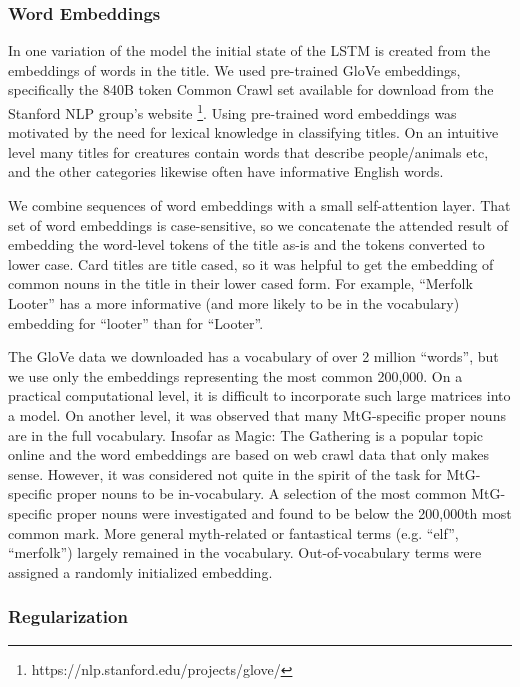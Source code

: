 \documentclass[letterpaper]{article} %
\begin{document}
\subsubsection{Word Embeddings}

In one variation of the model
the initial state of the LSTM
is created from the embeddings of words in the title.
We used pre-trained GloVe \cite{Pennington2014GloveGV} embeddings,
specifically the 840B token Common Crawl set
available for download from the Stanford NLP group's website
\footnote{https://nlp.stanford.edu/projects/glove/}.
Using pre-trained word embeddings
was motivated by the need for lexical knowledge in classifying titles.
On an intuitive level many titles for creatures
contain words that describe people/animals etc,
and the other categories likewise often have informative English words.

We combine sequences of word embeddings with a small self-attention layer.
That set of word embeddings is case-sensitive,
so we concatenate the attended result of embedding
the word-level tokens of the title as-is
and the tokens converted to lower case.
Card titles are title cased,
so it was helpful to get the embedding of common nouns in the title
in their lower cased form.
For example,
``Merfolk Looter''
has a more informative (and more likely to be in the vocabulary)
embedding for ``looter'' than for ``Looter''.

The GloVe data we downloaded has a vocabulary of over 2 million ``words'',
but we use only the embeddings representing the most common 200,000.
On a practical computational level,
it is difficult to incorporate such large matrices into a model.
On another level,
it was observed that many MtG-specific proper nouns are in the full vocabulary.
Insofar as Magic: The Gathering is a popular topic online and the word embeddings
are based on web crawl data that only makes sense.
However,
it was considered not quite in the spirit of the task
for MtG-specific proper nouns to be in-vocabulary.
A selection of the most common MtG-specific proper nouns were investigated
and found to be below the 200,000th most common mark.
More general myth-related or fantastical terms (e.g. ``elf'', ``merfolk'')
largely remained in the vocabulary.
Out-of-vocabulary terms were assigned a randomly initialized embedding.

\subsubsection{Regularization}
\end{document}
